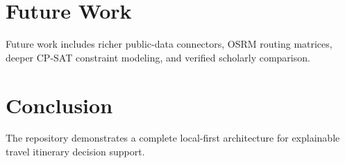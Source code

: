 \documentclass[11pt]{article}
\begin{document}
\section{Future Work}
Future work includes richer public-data connectors, OSRM routing matrices, deeper CP-SAT constraint modeling, and
verified scholarly comparison.

\section{Conclusion}
The repository demonstrates a complete local-first architecture for explainable travel itinerary decision support.



\end{document}

